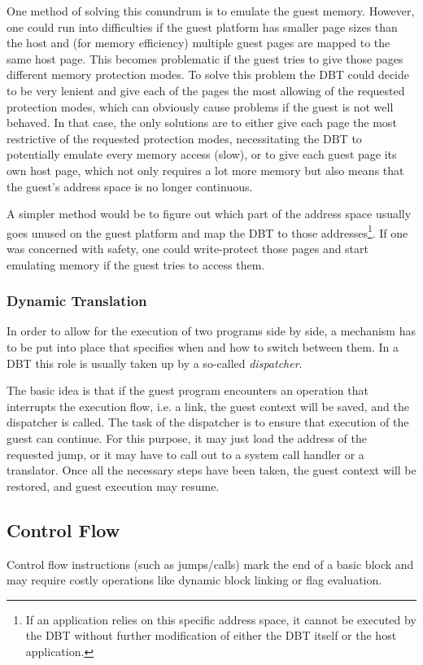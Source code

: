 		One method of solving this conundrum is to emulate the guest memory. However, one could run into difficulties if the guest platform has smaller page sizes than the host and (for memory efficiency) multiple guest pages are mapped to the same host page. This becomes problematic if the guest tries to give those pages different memory protection modes. To solve this problem the DBT could decide to be very lenient and give each of the pages the most allowing of the requested protection modes, which can obviously cause problems if the guest is not well behaved. In that case, the only solutions are to either give each page the most restrictive of the requested protection modes, necessitating the DBT to potentially emulate every memory access (slow), or to give each guest page its own host page, which not only requires a lot more memory but also means that the guest's address space is no longer continuous.
		
		A simpler method would be to figure out which part of the address space usually goes unused on the guest platform and map the DBT to those addresses\footnote{If an application relies on this specific address space, it cannot be executed by the DBT without further modification of either the DBT itself or the host application.}. If one was concerned with safety, one could write-protect those pages and start emulating memory if the guest tries to access them.

	\subsubsection{Dynamic Translation}
		In order to allow for the execution of two programs side by side, a mechanism has to be put into place that specifies when and how to switch between them. In a DBT this role is usually taken up by a so-called \emph{dispatcher}.
		
		The basic idea is that if the guest program encounters an operation that interrupts the execution flow, i.e. a link, the guest context will be saved, and the dispatcher is called. The task of the dispatcher is to ensure that execution of the guest can continue. For this purpose, it may just load the address of the requested jump, or it may have to call out to a system call handler or a translator. Once all the necessary steps have been taken, the guest context will be restored, and guest execution may resume.

\subsection{Control Flow}
	Control flow instructions (such as jumps/calls) mark the end of a basic block and may require costly operations like dynamic block linking or flag evaluation.
	
